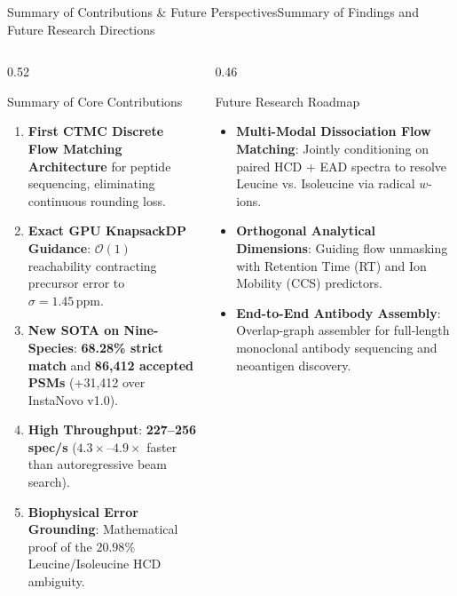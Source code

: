 \documentclass[aspectratio=169, 10pt]{beamer}
\begin{document}
\begin{frame}{Summary of Contributions \& Future Perspectives}{Summary of Findings and Future Research Directions}
\begin{columns}[T]
\begin{column}{0.52\textwidth}
  \begin{block}{\scriptsize Summary of Core Contributions}
    \begin{enumerate}\setlength{\itemsep}{1pt}\tiny
      \item \textbf{First CTMC Discrete Flow Matching Architecture} for peptide sequencing, eliminating continuous rounding loss.
      \item \textbf{Exact GPU KnapsackDP Guidance}: $\mathcal{O}(1)$ reachability contracting precursor error to $\sigma = 1.45\,\text{ppm}$.
      \item \textbf{New SOTA on Nine-Species}: \textbf{68.28\% strict match} and \textbf{86,412 accepted PSMs} (+31,412 over InstaNovo v1.0).
      \item \textbf{High Throughput}: \textbf{227--256 spec/s} ($4.3\times$--$4.9\times$ faster than autoregressive beam search).
      \item \textbf{Biophysical Error Grounding}: Mathematical proof of the $20.98\%$ Leucine/Isoleucine HCD ambiguity.
    \end{enumerate}
  \end{block}
\end{column}

\begin{column}{0.46\textwidth}
  \begin{exampleblock}{\scriptsize Future Research Roadmap}
    \begin{itemize}\setlength{\itemsep}{2pt}\tiny
      \item \textbf{Multi-Modal Dissociation Flow Matching}: Jointly conditioning on paired HCD + EAD spectra to resolve Leucine vs. Isoleucine via radical $w$-ions.
      \item \textbf{Orthogonal Analytical Dimensions}: Guiding flow unmasking with Retention Time (RT) and Ion Mobility (CCS) predictors.
      \item \textbf{End-to-End Antibody Assembly}: Overlap-graph assembler for full-length monoclonal antibody sequencing and neoantigen discovery.
    \end{itemize}
  \end{exampleblock}
\end{column}
\end{columns}
\end{frame}
\end{document}
